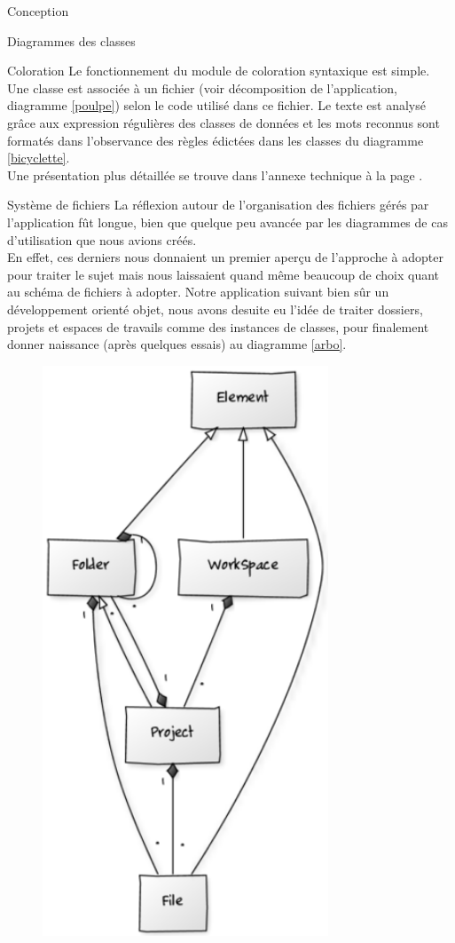 \documentclass[a4paper, 12pt]{report}
\begin{document}
\begin{part}{Conception}
\begin{chapter}{Diagrammes des classes}
\begin{section}{Coloration}
				Le fonctionnement du module de coloration syntaxique est simple. Une classe est associée à un fichier (voir décomposition de
				l'application, diagramme \ref{poulpe}) selon le code utilisé dans ce fichier. Le texte est analysé grâce aux
				\glspl{expression régulière} des classes de données et les mots reconnus sont formatés dans l'observance des règles édictées dans
				les classes du diagramme \ref{bicyclette}.\\
				Une présentation plus détaillée se trouve dans l'annexe technique à la page \pageref{annexe}.
			\end{section}
			\begin{section}{Système de fichiers}
				La réflexion autour de l'organisation des fichiers gérés par l'application fût longue, bien que quelque peu avancée par les
				diagrammes de cas d'utilisation que nous avions créés.\\
				En effet, ces derniers nous donnaient un premier aperçu de l'approche à adopter pour traiter le sujet mais nous laissaient quand
				même beaucoup de choix quant au schéma de fichiers à adopter. Notre application suivant bien sûr un développement orienté objet, 
				nous avons desuite eu l'idée de traiter dossiers, projets et espaces de travails comme des instances de classes, pour finalement 
				donner naissance (après quelques essais) au diagramme \ref{arbo}. \\
				\begin{figure}[ht]
					\begin{center}
						\includegraphics[height=17cm]{images/diagrammeArborescence.png}

\end{center}
\end{figure}
\end{section}
\end{chapter}
\end{part}
\end{document}
